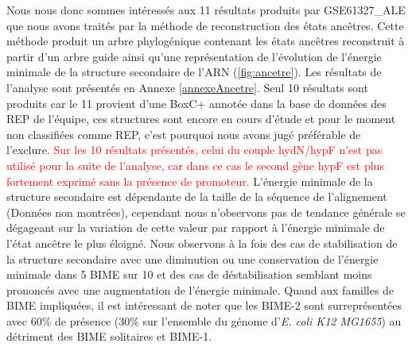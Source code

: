 \documentclass[12pt,a4paper]{report}
\begin{document}
\begin{onehalfspace}
Nous nous donc sommes intéressés aux 11 résultats produits par GSE61327\_ALE que nous avons traités par la méthode de reconstruction des états ancêtres. Cette méthode produit un arbre phylogénique contenant les états ancêtres reconstruit à partir d'un arbre guide ainsi qu'une représentation de l'évolution de l'énergie minimale de la structure secondaire de l'ARN (\autoref{fig:ancetre}). Les résultats de l'analyse sont présentés en Annexe \ref{annexeAncetre}. Seul 10 résultats sont produits car le 11 provient d'une BoxC+ annotée dans la base de données des REP de l'équipe, ces structures sont encore en cours d'étude et pour le moment non classifiées comme REP, c'est pourquoi nous avons jugé préférable de l'exclure. \textcolor{red}{Sur les 10 résultats présentés, celui du couple hydN/hypF n'est pas utilisé pour la suite de l'analyse, car dans ce cas le second gène hypF est plus fortement exprimé sans la présence de promoteur.} L'énergie minimale de la structure secondaire est dépendante de la taille de la séquence de l'alignement (Données non montrées), cependant nous n'observons pas de tendance générale se dégageant sur la variation de cette valeur par rapport à l'énergie minimale de l'état ancêtre le plus éloigné. Nous observons à la fois des cas de stabilisation de la structure secondaire avec une diminution ou une conservation de l'énergie minimale dans 5 BIME sur 10 et des cas de déstabilisation semblant moins prononcés avec une augmentation de l'énergie minimale. Quand aux familles de BIME impliquées, il est intéressant de noter que les BIME-2 sont surreprésentées avec 60\% de présence (30\% sur l'ensemble du génome d'\textit{E. coli K12 MG1655}) au détriment des BIME solitaires et BIME-1.


\end{onehalfspace}
\end{document}
